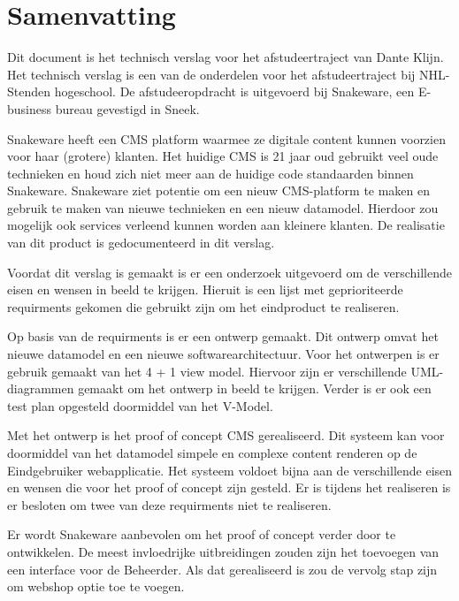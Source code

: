 \chapter*{Samenvatting}
Dit document is het technisch verslag voor het afstudeertraject van Dante Klijn.
Het technisch verslag is een van de onderdelen voor het afstudeertraject bij NHL-Stenden hogeschool.
De afstudeeropdracht is uitgevoerd bij Snakeware, een E-business bureau gevestigd in Sneek.

\whitespace
Snakeware heeft een \gls{CMS} platform waarmee ze digitale content kunnen voorzien voor haar (grotere) klanten.
Het huidige \gls{CMS} is 21 jaar oud gebruikt veel oude technieken en houd zich niet meer aan de huidige code standaarden binnen Snakeware.
Snakeware ziet potentie om een nieuw \gls{CMS}-platform te maken en gebruik te maken van nieuwe technieken en een nieuw datamodel.
Hierdoor zou mogelijk ook services verleend kunnen worden aan kleinere klanten.
De realisatie van dit product is gedocumenteerd in dit verslag.

\whitespace
Voordat dit verslag is gemaakt is er een onderzoek uitgevoerd om de verschillende eisen en wensen in beeld te krijgen.
Hieruit is een lijst met geprioriteerde requirments gekomen die gebruikt zijn om het eindproduct te realiseren.

\whitespace
Op basis van de requirments is er een ontwerp gemaakt.
Dit ontwerp omvat het nieuwe datamodel en een nieuwe softwarearchitectuur.
Voor het ontwerpen is er gebruik gemaakt van het 4 + 1 view model.
Hiervoor zijn er verschillende UML-diagrammen gemaakt om het ontwerp in beeld te krijgen.
Verder is er ook een test plan opgesteld doormiddel van het V-Model.

\whitespace
Met het ontwerp is het proof of concept \gls{CMS} gerealiseerd.
Dit systeem kan voor doormiddel van het datamodel simpele en complexe content renderen op de \gls{Eindgebruiker} webapplicatie.
Het systeem voldoet bijna aan de verschillende eisen en wensen die voor het proof of concept zijn gesteld. 
Er is tijdens het realiseren is er besloten om twee van deze requirments niet te realiseren.

\whitespace
Er wordt Snakeware aanbevolen om het proof of concept verder door te ontwikkelen.
De meest invloedrijke uitbreidingen zouden zijn het toevoegen van een interface voor de \gls{Beheerder}.
Als dat gerealiseerd is zou de vervolg stap zijn om webshop optie toe te voegen.
